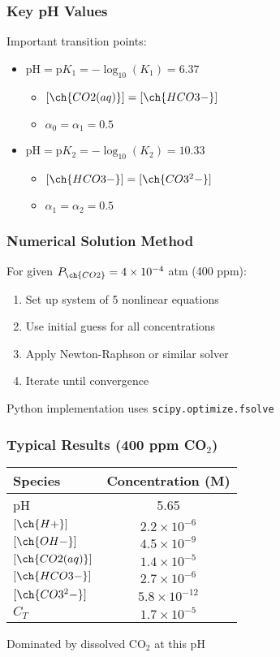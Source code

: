 \documentclass{beamer}
\begin{document}
\begin{frame}
\frametitle{Key pH Values}
Important transition points:
\begin{itemize}
\item $\text{pH} = \text{p}K_1 = -\log_{10}(K_1) = 6.37$
\begin{itemize}
\item $[\ch{CO2(aq)}] = [\ch{HCO3-}]$
\item $\alpha_0 = \alpha_1 = 0.5$
\end{itemize}
\item $\text{pH} = \text{p}K_2 = -\log_{10}(K_2) = 10.33$
\begin{itemize}
\item $[\ch{HCO3-}] = [\ch{CO3^2-}]$
\item $\alpha_1 = \alpha_2 = 0.5$
\end{itemize}
\end{itemize}
\end{frame}

\begin{frame}
\frametitle{Numerical Solution Method}
For given $P_{\ch{CO2}} = 4 \times 10^{-4}$ atm (400 ppm):

\begin{enumerate}
\item Set up system of 5 nonlinear equations
\item Use initial guess for all concentrations
\item Apply Newton-Raphson or similar solver
\item Iterate until convergence
\end{enumerate}

Python implementation uses \texttt{scipy.optimize.fsolve}
\end{frame}

\begin{frame}
\frametitle{Typical Results (400 ppm CO$_2$)}
\begin{table}
\centering
\begin{tabular}{|l|c|}
\hline
Species & Concentration (M) \\
\hline
pH & 5.65 \\
$[\ch{H+}]$ & $2.2 \times 10^{-6}$ \\
$[\ch{OH-}]$ & $4.5 \times 10^{-9}$ \\
$[\ch{CO2(aq)}]$ & $1.4 \times 10^{-5}$ \\
$[\ch{HCO3-}]$ & $2.7 \times 10^{-6}$ \\
$[\ch{CO3^2-}]$ & $5.8 \times 10^{-12}$ \\
$C_T$ & $1.7 \times 10^{-5}$ \\
\hline
\end{tabular}
\end{table}

Dominated by dissolved CO$_2$ at this pH
\end{frame}
\end{document}
